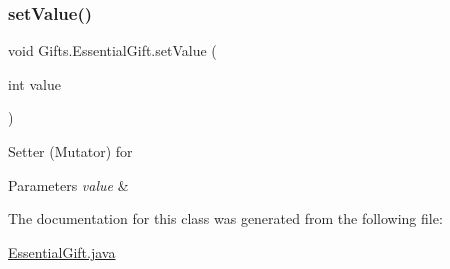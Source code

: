 \subsubsection{\texorpdfstring{set\+Value()}{setValue()}}
{\footnotesize\ttfamily void Gifts.\+Essential\+Gift.\+set\+Value (\begin{DoxyParamCaption}\item[{int}]{value }\end{DoxyParamCaption})\hspace{0.3cm}{\ttfamily [inline]}}

Setter (Mutator) for 
\begin{DoxyParams}{Parameters}
{\em value} & \\
\hline
\end{DoxyParams}


The documentation for this class was generated from the following file\+:\begin{DoxyCompactItemize}
\item 
\hyperlink{_essential_gift_8java}{Essential\+Gift.\+java}\end{DoxyCompactItemize}
